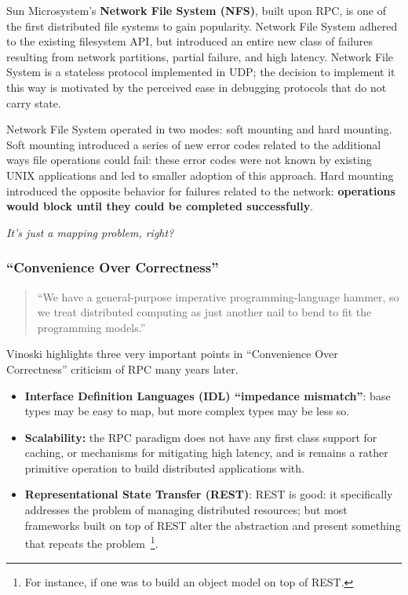 Sun Microsystem's \textbf{Network File System (NFS)}, built upon RPC, is one of the first distributed file systems to gain popularity.  Network File System adhered to the existing filesystem API, but introduced an entire new class of failures resulting from network partitions, partial failure, and high latency.  Network File System is a stateless protocol implemented in UDP; the decision to implement it this way is motivated by the perceived ease in debugging protocols that do not carry state.

Network File System operated in two modes: soft mounting and hard mounting.  Soft mounting introduced a series of new error codes related to the additional ways file operations could fail: these error codes were not known by existing UNIX applications and led to smaller adoption of this approach.  Hard mounting introduced the opposite behavior for failures related to the network: \textbf{operations would block until they could be completed successfully}.  

\textit{It's just a mapping problem, right?}~\cite{vinoski2003s}

\subsubsection{``Convenience Over Correctness''}

\begin{quote}
``We have a general-purpose imperative programming-language
hammer, so we treat distributed computing as just another nail to
bend to fit the programming models.''~\cite{vinoski2008convenience}
\end{quote}

Vinoski highlights three very important points in ``Convenience Over Correctness'' criticism of RPC many years later.

\begin{itemize}
\item \textbf{Interface Definition Languages (IDL) ``impedance mismatch''}: base types may be easy to map, but more complex types may be less so.
\item \textbf{Scalability:} the RPC paradigm does not have any first class support for caching, or mechanisms for mitigating high latency, and is remains a rather primitive operation to build distributed applications with.
\item \textbf{Representational State Transfer (REST)}: REST is good: it specifically addresses the problem of managing distributed resources; but most frameworks built on top of REST alter the abstraction and present something that repeats the problem~\footnote{For instance, if one was to build an object model on top of REST.}.	 
\end{itemize}

